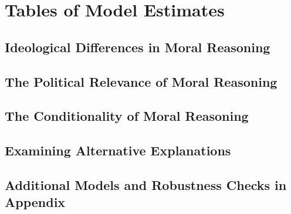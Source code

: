 \documentclass[12pt]{article}
\begin{document}
\clearpage
\section{Tables of Model Estimates}\label{app:tables}
\renewcommand\thefigure{\thesection.\arabic{figure}}
\renewcommand\thetable{\thesection.\arabic{table}}
\setcounter{figure}{0}
\setcounter{table}{0}


\subsection*{Ideological Differences in Moral Reasoning}


\clearpage
\subsection*{The Political Relevance of Moral Reasoning}



\clearpage
\subsection*{The Conditionality of Moral Reasoning}






\clearpage
\subsection*{Examining Alternative Explanations}


\clearpage
\subsection*{Additional Models and Robustness Checks in Appendix}


\end{document}
